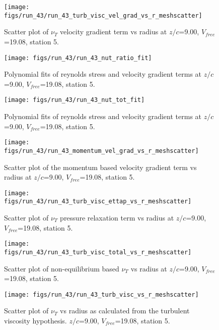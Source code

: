 \begin{figure}[H]
\centering
\texttt{[image: figs/run\_43/run\_43\_turb\_visc\_vel\_grad\_vs\_r\_meshscatter]}
\caption{Scatter plot of $\nu_T$ velocity gradient term vs radius at $z/c$=9.00, $V_{free}$=19.08, station 5.}
\end{figure}


\begin{figure}[H]
\centering
\texttt{[image: figs/run\_43/run\_43\_nut\_ratio\_fit]}
\caption{Polynomial fits of reynolds stress and velocity gradient terms at $z/c$=9.00, $V_{free}$=19.08, station 5.}
\end{figure}


\begin{figure}[H]
\centering
\texttt{[image: figs/run\_43/run\_43\_nut\_tot\_fit]}
\caption{Polynomial fits of reynolds stress and velocity gradient terms at $z/c$=9.00, $V_{free}$=19.08, station 5.}
\end{figure}


\begin{figure}[H]
\centering
\texttt{[image: figs/run\_43/run\_43\_momentum\_vel\_grad\_vs\_r\_meshscatter]}
\caption{Scatter plot of the momentum based velocity gradient term vs radius at $z/c$=9.00, $V_{free}$=19.08, station 5.}
\end{figure}


\begin{figure}[H]
\centering
\texttt{[image: figs/run\_43/run\_43\_turb\_visc\_ettap\_vs\_r\_meshscatter]}
\caption{Scatter plot of $\nu_T$ pressure relaxation term vs radius at $z/c$=9.00, $V_{free}$=19.08, station 5.}
\end{figure}


\begin{figure}[H]
\centering
\texttt{[image: figs/run\_43/run\_43\_turb\_visc\_total\_vs\_r\_meshscatter]}
\caption{Scatter plot of non-equilibrium based $\nu_T$ vs radius at $z/c$=9.00, $V_{free}$=19.08, station 5.}
\end{figure}


\begin{figure}[H]
\centering
\texttt{[image: figs/run\_43/run\_43\_turb\_visc\_vs\_r\_meshscatter]}
\caption{Scatter plot of $\nu_T$ vs radius as calculated from the turbulent viscosity hypothesis. $z/c$=9.00, $V_{free}$=19.08, station 5.}
\end{figure}


